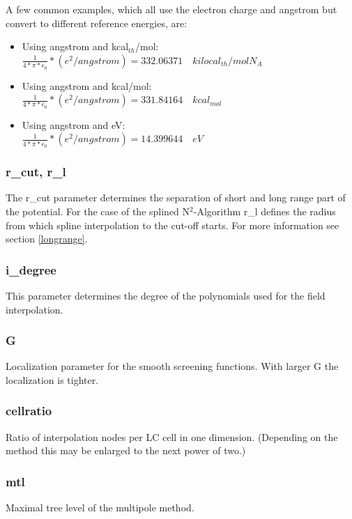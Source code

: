 A few common examples, which all use the electron charge and angstrom but convert to different reference energies, are:
\begin{itemize} 
\item Using angstrom and kcal$_{th}$/mol:\\
$ \frac{1}{4*\pi*\epsilon_0} * (e^2/angstrom) = 332.06371 \quad kilo cal_{th} / mol N_A$

\item Using angstrom and kcal/mol:\\
$ \frac{1}{4*\pi*\epsilon_0} * (e^2/angstrom) = 331.84164  \quad kcal_{mol}$

\item Using angstrom and eV:\\
$ \frac{1}{4*\pi*\epsilon_0} * (e^2/angstrom) = 14.399644  \quad eV $
\end{itemize}

\subsubsection{r\_cut, r\_l}
The r\_cut parameter determines the separation of short and long range part of the potential. For the case of the splined N$^2$-Algorithm 
r\_l defines the radius from which spline interpolation to the cut-off starts. For more information see section \ref{longrange}.
\subsubsection{i\_degree}
This parameter determines the degree of the polynomials used for the field interpolation.
\subsubsection{G}
Localization parameter for the smooth screening functions. With larger G the localization is tighter.
\subsubsection{cellratio}
Ratio of interpolation nodes per LC cell in one dimension. (Depending on the method this may be enlarged to the next power of two.)
\subsubsection{mtl}
Maximal tree level of the multipole method.

